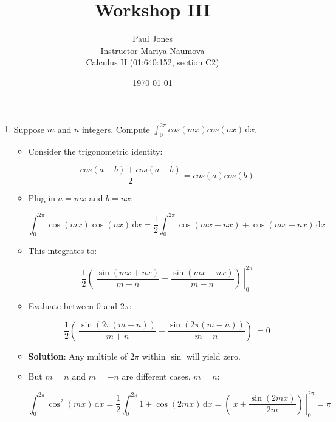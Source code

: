 \documentclass[11pt]{article}
\title{Workshop III}
\author{Paul Jones \\
		Instructor Mariya Naumova\\
		Calculus II (01:640:152, section C2)}
\date{\today}
\begin{document}
\maketitle

\pagebreak

\begin{enumerate}

\item Suppose $m$ and $n$ integers. Compute $ \int_0^{2\pi} \! cos(mx)cos(nx) \, \mathrm{d} x$.

\begin{itemize}

\item Consider the trigonometric identity:

\begin{equation*}
\frac{cos(a + b) + cos(a - b)}{2} = cos(a)cos(b)
\end{equation*}

\item Plug in $a = mx$ and $b = nx$:

\begin{equation*}
\int_0^{2\pi} \! \cos(mx)\cos(nx) \, \mathrm{d} x = \frac{1}{2}\int_0^{2\pi} \! \cos(mx + nx) + \cos(mx - nx) \, \mathrm{d} x
\end{equation*}

\item This integrates to:

\begin{equation*}
\left. \frac{1}{2}\left(\ \frac{\sin(mx+nx)}{m + n} + \frac{\sin(mx - nx)}{m - n} \right)\ \right|_0^{2\pi}
\end{equation*}

\item Evaluate between 0 and $2\pi$:

\begin{equation*}
\frac{1}{2}\left(\ \frac{\sin(2\pi(m+n))}{m + n} + \frac{\sin(2\pi(m - n))}{m - n} \right)\ = 0
\end{equation*}

\item {\bf Solution}: Any multiple of $2\pi$ within $\sin$ will yield zero.

\item But $m = n$ and $m = -n$ are different cases. $m = n$:

\begin{equation*}
\int_0^{2\pi} \! \cos^2(mx) \, \mathrm{d} x = \frac{1}{2}\int_0^{2\pi} \! 1 + \cos(2mx) \, \mathrm{d} x = \left. \left(\ x + \frac{\sin(2mx)}{2m} \right)\ \right|_0^{2\pi} = \pi
\end{equation*}


\end{itemize}
\end{enumerate}
\end{document}
